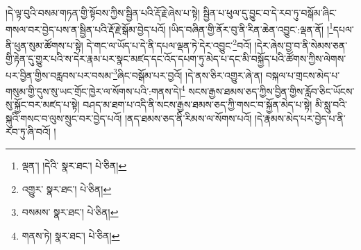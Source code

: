 །དེ་ལྟ་བུའི་བསམ་གཏན་གྱི་སྟོབས་ཀྱིས་སྦྱིན་པའི་རྡོ་རྗེ་ཞེས་པ་སྟེ། སྦྱིན་པ་ཕུལ་དུ་བྱུང་བ་དེ་རབ་ཏུ་བསྒོམ་ཞིང་གསལ་བར་བྱེད་པས་ན་སྦྱིན་པའི་རྡོ་རྗེ་སྒོམ་བྱེད་པའོ། །ཡིད་བཞིན་གྱི་ནོར་བུ་ནི་རིན་ཆེན་འབྱུང་:ལྡན་ནོ། །\footnote{ལྡན་། །དེའི་  སྣར་ཐང་།  པེ་ཅིན། }དཔལ་ནི་ཕུན་སུམ་ཚོགས་པ་སྟེ། དེ་གང་ལ་ཡོད་པ་དེ་ནི་དཔལ་ལྡན་ཏེ་དེར་འབྱུང་\footnote{འགྱུར་  སྣར་ཐང་།  པེ་ཅིན། }བའོ། །དེར་ཞེས་བྱ་བ་ནི་སེམས་ཅན་གྱི་རྟེན་དུ་གྱུར་པའི་ས་དེར་རྣམ་པར་སྣང་མཛད་དང་འོད་དཔག་ཏུ་མེད་པ་དང་མི་བསྐྱོད་པའི་ཚོགས་ཀྱིས་ལེགས་པར་བྱིན་གྱིས་བརླབས་པར་བསམ་\footnote{བསམས་  སྣར་ཐང་།  པེ་ཅིན། }ཞིང་བསྒོམ་པར་བྱའོ། །དེ་ནས་ཅིར་འགྱུར་ཞེ་ན། བསྐལ་པ་གྲངས་མེད་པ་གསུམ་གྱི་དུས་སུ་ཡང་གྲོང་ཁྱེར་ལ་སོགས་པའི་:གནས་དེ།\footnote{གནས་ཏེ།  སྣར་ཐང་།  པེ་ཅིན། } སངས་རྒྱས་ཐམས་ཅད་ཀྱིས་བྱིན་གྱིས་རློབ་ཅིང་ཡོངས་སུ་སྐྱོང་བར་མཛད་པ་སྟེ། བཤད་མ་ཐག་པ་འདི་ནི་སངས་རྒྱས་ཐམས་ཅད་ཀྱི་གསང་བ་སྐྱོན་མེད་པ་སྟེ། མི་སླུ་བའི་སྐུའི་གསང་བ་ལུས་སྲུང་བར་བྱེད་པའོ། །ནད་ཐམས་ཅད་ནི་རིམས་ལ་སོགས་པའོ། །དེ་རྣམས་མེད་པར་བྱེད་པ་ནི་རབ་ཏུ་ཞི་བའོ། །
